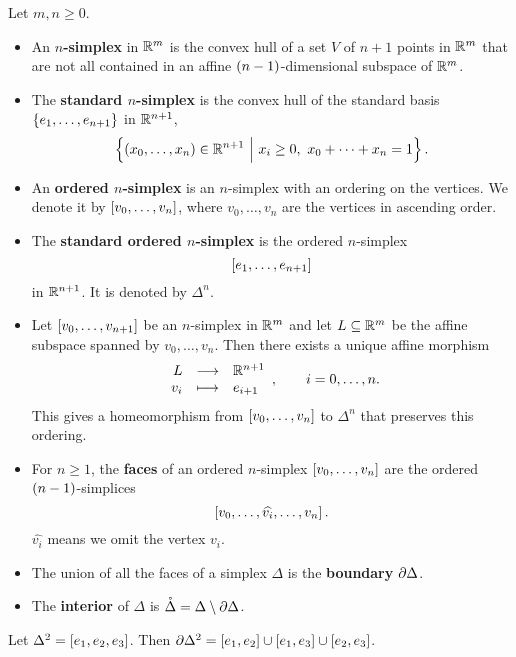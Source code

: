\begin{definition*}
Let $ m, n \ge 0 $.
\begin{itemize}
\item An \textbf{$ n $-simplex} in $ \mathbb{R}^m $ is the convex hull of a set $ V $ of $ n + 1 $ points in $ \mathbb{R}^m $ that are not all contained in an affine $ \br{n - 1} $-dimensional subspace of $ \mathbb{R}^m $.
\item The \textbf{standard $ n $-simplex} is the convex hull of the standard basis $ \cbr{e_1, \dots, e_{n + 1}} $ in $ \mathbb{R}^{n + 1} $,
$$ \cbr{\br{x_0, \dots, x_n} \in \RR^{n + 1} \st x_i \ge 0, \ x_0 + \dots + x_n = 1}. $$
\item An \textbf{ordered $ n $-simplex} is an $ n $-simplex with an ordering on the vertices. We denote it by $ \sbr{v_0, \dots, v_n} $, where $ v_0, \dots, v_n $ are the vertices in ascending order.
\item The \textbf{standard ordered $ n $-simplex} is the ordered $ n $-simplex
$$ \sbr{e_1, \dots, e_{n + 1}} $$
in $ \mathbb{R}^{n + 1} $. It is denoted by $ \Delta^n $.
\item Let $ \sbr{v_0, \dots, v_{n + 1}} $ be an $ n $-simplex in $ \mathbb{R}^m $ and let $ L \subseteq \mathbb{R}^m $ be the affine subspace spanned by $ v_0, \dots, v_n $. Then there exists a unique affine morphism
$$ \function{L}{\RR^{n + 1}}{v_i}{e_{i + 1}}, \qquad i = 0, \dots, n. $$
This gives a homeomorphism from $ \sbr{v_0, \dots, v_n} $ to $ \Delta^n $ that preserves this ordering.
\item For $ n \ge 1 $, the \textbf{faces} of an ordered $ n $-simplex $ \sbr{v_0, \dots, v_n} $ are the ordered $ \br{n - 1} $-simplices
$$ \sbr{v_0, \dots, \widehat{v_i}, \dots, v_n}. $$
$ \widehat{v_i} $ means we omit the vertex $ v_i $.
\item The union of all the faces of a simplex $ \Delta $ is the \textbf{boundary} $ \partial\Delta $.
\item The \textbf{interior} of $ \Delta $ is $ \mathring{\Delta} = \Delta \setminus \partial\Delta $.
\end{itemize}
\end{definition*}

\begin{example*}
Let $ \Delta^2 = \sbr{e_1, e_2, e_3} $. Then $ \da\Delta^2 = \sbr{e_1, e_2} \cup \sbr{e_1, e_3} \cup \sbr{e_2, e_3} $.
\end{example*}

\pagebreak

